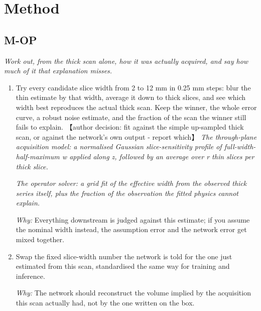 \documentclass[10pt,a4paper]{article}
\begin{document}
\section*{Method}
\subsection*{M-OP}
\emph{Work out, from the thick scan alone, how it was actually acquired, and say how much of it that explanation misses.}
\begin{enumerate}[leftmargin=*,start=1]
  \item Try every candidate slice width from 2 to 12 mm in 0.25 mm steps: blur the thin estimate by that width, average it down to thick slices, and see which width best reproduces the actual thick scan. Keep the winner, the whole error curve, a robust noise estimate, and the fraction of the scan the winner still fails to explain. 【author decision: fit against the simple up-sampled thick scan, or against the network's own output - report which】
\noindent\emph{The through-plane acquisition model: a normalised Gaussian slice-sensitivity profile of full-width-half-maximum w applied along z, followed by an average over r thin slices per thick slice.}
\par{}
\noindent\emph{The operator solver: a grid fit of the effective width from the observed thick series itself, plus the fraction of the observation the fitted physics cannot explain.}
\par{}
\par\emph{Why:} Everything downstream is judged against this estimate;\allowbreak{} if you assume the nominal width instead, the assumption error and the network error get mixed together.
  \item Swap the fixed slice-width number the network is told for the one just estimated from this scan, standardised the same way for training and inference.
\par\emph{Why:} The network should reconstruct the volume implied by the acquisition this scan actually had, not by the one written on the box.
\end{enumerate}
\end{document}
